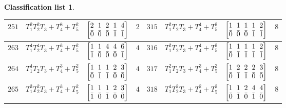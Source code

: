 \documentclass[pdftex]{sigma}%
\theoremstyle{definition}
\newtheorem{class-list}[thm]{Classification list}
\numberwithin{equation}{section}
\begin{document}
\begin{class-list}
\begin{table}[h!]
\begin{tabu}{c|c|c|c||c|c|c|c}
\\
\hline
${251}$&${T_{1}^{2}T_{2}^{2}T_{3}+T_{4}^{8}+T_{5}^{2}}$
&$\arraycolsep=1mm\begin{bmatrix}{2} & {1} & {2} & {1} & {4} \\ {\bar{0}} & {\bar{0}} & {\bar{0}} & {\bar{1}} & {\bar{1}}\end{bmatrix}$&${2}$
&${315}$&${T_{1}^{2}T_{2}T_{3}+T_{4}^{4}+T_{5}^{2}}$
&$\arraycolsep=1mm\begin{bmatrix}{1} & {1} & {1} & {1} & {2} \\ {\bar{0}} & {\bar{0}} & {\bar{0}} & {\bar{1}} & {\bar{1}}\end{bmatrix}$&${8}$
\\
\hline
${263}$&${T_{1}^{4}T_{2}^{4}T_{3}+T_{4}^{3}+T_{5}^{2}}$
&$\arraycolsep=1mm\begin{bmatrix}{1} & {1} & {4} & {4} & {6} \\ {\bar{1}} & {\bar{0}} & {\bar{0}} & {\bar{0}} & {\bar{1}}\end{bmatrix}$&${4}$
&${316}$&${T_{1}^{2}T_{2}T_{3}+T_{4}^{4}+T_{5}^{2}}$
&$\arraycolsep=1mm\begin{bmatrix}{1} & {1} & {1} & {1} & {2} \\ {\bar{0}} & {\bar{1}} & {\bar{1}} & {\bar{1}} & {\bar{1}}\end{bmatrix}$&${8}$
\\
\hline
${264}$&${T_{1}^{4}T_{2}T_{3}+T_{4}^{3}+T_{5}^{2}}$
&$\arraycolsep=1mm\begin{bmatrix}{1} & {1} & {1} & {2} & {3} \\ {\bar{0}} & {\bar{1}} & {\bar{1}} & {\bar{0}} & {\bar{0}}\end{bmatrix}$&${4}$
&${317}$&${T_{1}^{2}T_{2}T_{3}+T_{4}^{3}+T_{5}^{2}}$
&$\arraycolsep=1mm\begin{bmatrix}{1} & {2} & {2} & {2} & {3} \\ {\bar{0}} & {\bar{1}} & {\bar{1}} & {\bar{0}} & {\bar{0}}\end{bmatrix}$&${8}$
\\
\hline
${265}$&${T_{1}^{3}T_{2}^{2}T_{3}+T_{4}^{3}+T_{5}^{2}}$
&$\arraycolsep=1mm\begin{bmatrix}{1} & {1} & {1} & {2} & {3} \\ {\bar{1}} & {\bar{0}} & {\bar{1}} & {\bar{0}} & {\bar{0}}\end{bmatrix}$&${4}$
&${318}$&${T_{1}^{4}T_{2}^{2}T_{3}+T_{4}^{2}+T_{5}^{2}}$
&$\arraycolsep=1mm\begin{bmatrix}{1} & {1} & {2} & {4} & {4} \\ {\bar{0}} & {\bar{1}} & {\bar{0}} & {\bar{1}} & {\bar{0}}\end{bmatrix}$&${8}$

\end{tabu}
\end{table}
\end{class-list}
\end{document}
